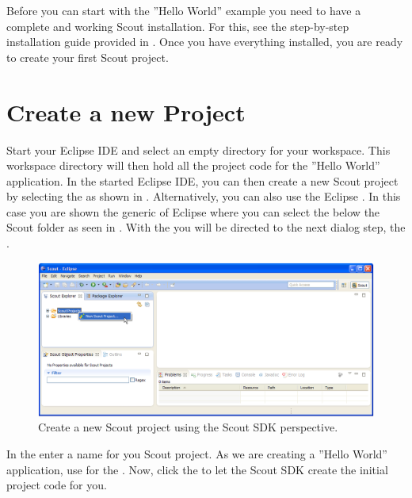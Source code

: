\documentclass[a4paper,10pt,twoside]{book}
\begin{document}
Before you can start with the ''Hello World'' example you need to have a complete and working Scout installation.
For this, see the step-by-step installation guide provided in .
Once you have everything installed, you are ready to create your first Scout project.

\section{Create a new Project}

Start your Eclipse IDE and select an empty directory for your workspace.
This workspace directory will then hold all the project code for the ''Hello World'' application.
In the started Eclipse IDE, you can then create a new Scout project by selecting the  as shown in .
Alternatively, you can also use the Eclipse .
In this case you are shown the generic  of Eclipse where you can select the  below the Scout folder as seen in .
With the  you will be directed to the next dialog step, the .

\begin{figure}
\includegraphics[width=14cm]{sdk_create_new_scout_project.png}
\caption{Create a new Scout project using the Scout SDK perspective.}
\end{figure}

In the  enter a name for you Scout project. 
As we are creating a ''Hello World'' application, use  for the .
Now, click the  to let the Scout SDK create the initial project code for you.
\end{document}
